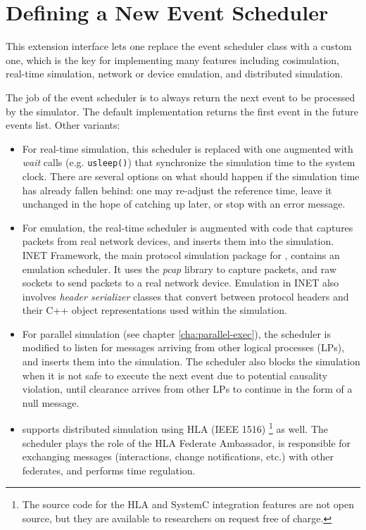 \section{Defining a New Event Scheduler}
\label{sec:plugin-exts:scheduler}

This extension interface lets one replace the event scheduler class with a
custom one, which is the key for implementing many features including
cosimulation, real-time simulation, network or device emulation, and
distributed simulation.

The job of the event scheduler is to always return the next event to be
processed by the simulator. The default implementation returns the first
event in the future events list. Other variants:

\begin{itemize}
\item For real-time simulation, this scheduler is replaced with one augmented
    with \textit{wait} calls (e.g. \texttt{usleep()}) that synchronize the
    simulation time to the system clock. There are several options on what
    should happen if the simulation time has already fallen behind: one may
    re-adjust the reference time, leave it unchanged in the hope of catching up
    later, or stop with an error message.

\item For emulation, the real-time scheduler is augmented with code that captures
    packets from real network devices, and inserts them into the simulation.
    INET Framework, the main protocol simulation package for {\opp}, contains
    an emulation scheduler. It uses the \textit{pcap} library to capture
    packets, and raw sockets to send packets to a real network device.
    Emulation in INET also involves \textit{header serializer} classes that
    convert between protocol headers and their C++ object representations used
    within the simulation.

\item For parallel simulation (see chapter \ref{cha:parallel-exec}), the
    scheduler is modified to listen for messages arriving from other logical
    processes (LPs), and inserts them into the simulation. The scheduler also
    blocks the simulation when it is not safe to execute the next event due to
    potential causality violation, until clearance arrives from other LPs to
    continue in the form of a null message.

\item {\opp} supports distributed simulation using HLA (IEEE 1516) \footnote{The
    source code for the HLA and SystemC integration features are not open
    source, but they are available to researchers on request free of charge.}
    as well. The scheduler plays the role of the HLA Federate Ambassador, is
    responsible for exchanging messages (interactions, change notifications,
    etc.) with other federates, and performs time regulation.


\end{itemize}
